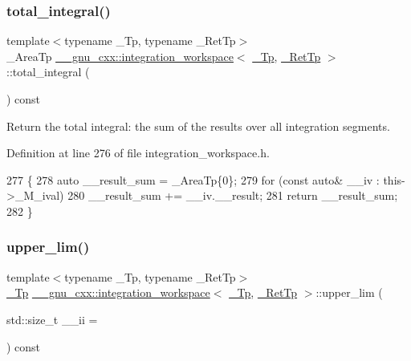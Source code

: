 \subsubsection{\texorpdfstring{total\+\_\+integral()}{total\_integral()}}
{\footnotesize\ttfamily template$<$typename \+\_\+\+Tp, typename \+\_\+\+Ret\+Tp$>$ \\
\+\_\+\+Area\+Tp \hyperlink{class____gnu__cxx_1_1integration__workspace}{\+\_\+\+\_\+gnu\+\_\+cxx\+::integration\+\_\+workspace}$<$ \hyperlink{namespace____gnu__cxx_a3b19a9c800ca194374ef9172290f7d79}{\+\_\+\+Tp}, \hyperlink{namespace____gnu__cxx_a886e03ece3d53ff7fa6c098a40f93fa5}{\+\_\+\+Ret\+Tp} $>$\+::total\+\_\+integral (\begin{DoxyParamCaption}{ }\end{DoxyParamCaption}) const\hspace{0.3cm}{\ttfamily [inline]}}



Return the total integral\+: the sum of the results over all integration segments. 



Definition at line 276 of file integration\+\_\+workspace.\+h.


\begin{DoxyCode}
277       \{
278         \textcolor{keyword}{auto} \_\_result\_sum = \_AreaTp\{0\};
279         \textcolor{keywordflow}{for} (\textcolor{keyword}{const} \textcolor{keyword}{auto}& \_\_iv : this->\_M\_ival)
280           \_\_result\_sum += \_\_iv.\_\_result;
281         \textcolor{keywordflow}{return} \_\_result\_sum;
282       \}
\end{DoxyCode}
\mbox{\label{class____gnu__cxx_1_1integration__workspace_ac4b398d0af1711c00b6859ca8933b858}} 
\subsubsection{\texorpdfstring{upper\+\_\+lim()}{upper\_lim()}}
{\footnotesize\ttfamily template$<$typename \+\_\+\+Tp, typename \+\_\+\+Ret\+Tp$>$ \\
\hyperlink{namespace____gnu__cxx_a3b19a9c800ca194374ef9172290f7d79}{\+\_\+\+Tp} \hyperlink{class____gnu__cxx_1_1integration__workspace}{\+\_\+\+\_\+gnu\+\_\+cxx\+::integration\+\_\+workspace}$<$ \hyperlink{namespace____gnu__cxx_a3b19a9c800ca194374ef9172290f7d79}{\+\_\+\+Tp}, \hyperlink{namespace____gnu__cxx_a886e03ece3d53ff7fa6c098a40f93fa5}{\+\_\+\+Ret\+Tp} $>$\+::upper\+\_\+lim (\begin{DoxyParamCaption}\item[{std\+::size\+\_\+t}]{\+\_\+\+\_\+ii = {} }\end{DoxyParamCaption}) const\hspace{0.3cm}{\ttfamily [inline]}}

